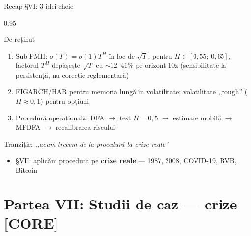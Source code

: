 \documentclass[9pt, aspectratio=169, t]{beamer}
\begin{document}
\begin{frame}[shrink=15]{Recap §VI: 3 idei-cheie}
\begin{cminipage}{0.95\textwidth}
\begin{block}{De reținut}
\begin{enumerate}\setlength{\itemsep}{4pt}
    \item Sub FMH: $\sigma(T)=\sigma(1)T^H$ în loc de $\sqrt T$; pentru $H\in[0{,}55;\,0{,}65]$, factorul $T^H$ depășește $\sqrt T$ cu $\sim 12$--$41\%$ pe orizont 10z (sensibilitate la persistență, nu corecție reglementară)
    \item FIGARCH/HAR pentru memoria lungă în volatilitate; volatilitate ,,rough'' ($H\approx 0{,}1$) pentru opțiuni
    \item Procedură operațională: DFA $\to$ test $H=0{,}5$ $\to$ estimare mobilă $\to$ MFDFA $\to$ recalibrarea riscului
\end{enumerate}
\end{block}
\begin{exampleblock}{Tranziție: \textit{,,acum trecem de la procedură la crize reale''}}
\begin{itemize}\setlength{\itemsep}{0pt}
    \item §VII: aplicăm procedura pe \textbf{crize reale} --- 1987, 2008, COVID-19, BVB, Bitcoin
\end{itemize}
\end{exampleblock}
\end{cminipage}
\end{frame}

\section{Partea VII: Studii de caz --- crize [CORE]}
\end{document}
